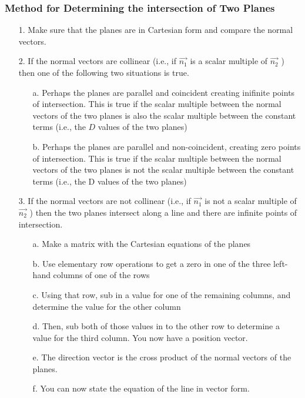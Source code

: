 \documentclass{article}
\begin{document}
\subsubsection{Method for Determining the intersection of Two Planes}
\begin{enumerate}
    \item [1.] Make sure that the planes are in Cartesian form and compare the normal vectors.
    \item [2.] If the normal vectors are collinear (i.e., if $\overrightarrow{n_1}$ is a scalar multiple of $\overrightarrow{n_2}$ ) then one of the following two situations is true.
    \begin{enumerate}
    \item [a.] Perhaps the planes are parallel and coincident creating inifinite points of intersection. This is true if the scalar multiple between the normal vectors of the two planes is also the scalar multiple between the constant terms (i.e., the $D$ values of the two planes)
    \item[b.] Perhaps the planes are parallel and non-coincident, creating zero points of intersection. This is true if the scalar multiple between the normal vectors of the two planes is not the scalar multiple between the constant terms (i.e., the D values of the two planes)
    \end{enumerate}

\item[3.] If the normal vectors are not collinear (i.e., if $\overrightarrow{n_1}$ is not a scalar multiple of $\overrightarrow{n_2}$ ) then the two planes intersect along a line and there are infinite points of intersection.
\begin{enumerate}
    \item[a.] Make a matrix with the Cartesian equations of the planes
    \item[b.] Use elementary row operations to get a zero in one of the three left-hand columns of one of the rows
    \item[c.] Using that row, sub in a value for one of the remaining columns, and determine the value for the other column
    \item[d.] Then, sub both of those values in to the other row to determine a value for the third column. You now have a position vector.
    \item[e.] The direction vector is the cross product of the normal vectors of the planes.
    \item[f.] You can now state the equation of the line in vector form.
\end{enumerate}
\end{enumerate}
\end{document}
